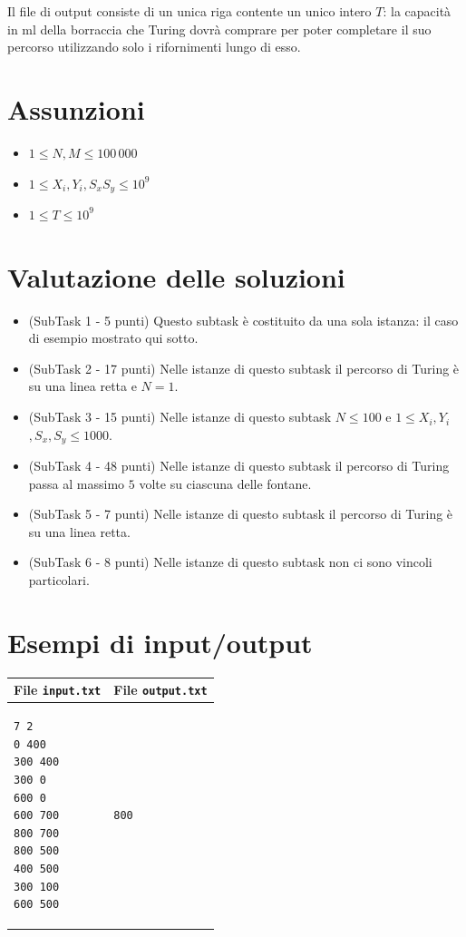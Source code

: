 \documentclass[a4paper,11pt]{article}
\begin{document}
Il file di output consiste di un unica riga contente un unico intero
$T$: la capacità in ml della borraccia che Turing dovrà comprare per
poter completare il suo percorso utilizzando solo i rifornimenti lungo
di esso.
    
\section*{Assunzioni}

\begin{itemize}
  \item $1 ≤ N, M ≤ 100\,000$
  \item $1 ≤ X_{i}$$, Y_{i}$$, S_{x}$$ S_{y}$$ ≤ 10^{9}$
  \item $1 ≤ T ≤ 10^{9}$
\end{itemize}

\section*{Valutazione delle soluzioni}

\begin{itemize}
  \item (SubTask 1 - 5 punti) Questo subtask è costituito da una sola
    istanza: il caso di esempio mostrato qui sotto.
  \item (SubTask 2 - 17 punti) Nelle istanze di questo subtask il
    percorso di Turing è su una linea retta e $N=1$.
  \item (SubTask 3 - 15 punti) Nelle istanze di questo subtask  $N ≤
    100$ e $1 ≤ X_{i}$$, Y_{i}$$, S_{x}$$, S_{y}$$ ≤ 1000$.
  \item (SubTask 4 - 48 punti) Nelle istanze di questo subtask il
    percorso di Turing passa al massimo $5$ volte su ciascuna delle
    fontane.
  \item (SubTask 5 - 7 punti) Nelle istanze di questo subtask il
    percorso di Turing è su una linea retta.
  \item (SubTask 6 - 8 punti) Nelle istanze di questo subtask non ci
    sono vincoli particolari.
\end{itemize}

\section*{Esempi di input/output}
    \noindent
    \begin{tabular}{p{11cm}|p{5cm}}
    \toprule
    \textbf{File \texttt{input.txt}}
    & \textbf{File \texttt{output.txt}}
    \\
    \midrule
    \scriptsize
    \begin{verbatim}
7 2
0 400
300 400
300 0
600 0
600 700
800 700
800 500
400 500
300 100
600 500
      \end{verbatim}
    &
    \scriptsize
    \begin{verbatim}
800
      \end{verbatim}
    \\
    \bottomrule
    \end{tabular}
  
\end{document}
